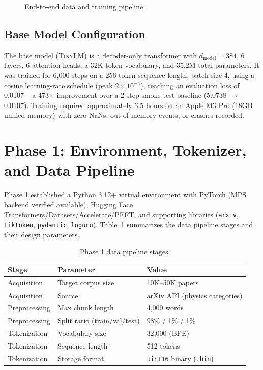 \documentclass[11pt]{article}
\begin{document}
\begin{figure}[h]
\centering
{}
\caption{End-to-end data and training pipeline.}
\label{fig:arch}
\end{figure}

\subsection{Base Model Configuration}
The base model (\textsc{TinyLM}) is a decoder-only transformer with
$d_{\text{model}}=384$, 6 layers, 6 attention heads, a 32K-token vocabulary,
and 35.2M total parameters. It was trained for 6{,}000 steps on a 256-token
sequence length, batch size 4, using a cosine learning-rate schedule
(peak $2\times10^{-4}$), reaching an evaluation loss of 0.0107 -- a
473$\times$ improvement over a 2-step smoke-test baseline (5.0738
$\rightarrow$ 0.0107). Training required approximately 3.5 hours on an
Apple M3 Pro (18GB unified memory) with zero NaNs, out-of-memory events, or
crashes recorded.

\section{Phase 1: Environment, Tokenizer, and Data Pipeline}
Phase 1 established a Python 3.12+ virtual environment with PyTorch (MPS
backend verified available), Hugging Face Transformers/Datasets/Accelerate/PEFT,
and supporting libraries (\texttt{arxiv}, \texttt{tiktoken}, \texttt{pydantic},
\texttt{loguru}). Table~\ref{tab:phase1} summarizes the data pipeline stages
and their design parameters.

\begin{table}[h]
\centering
\caption{Phase 1 data pipeline stages.}
\label{tab:phase1}
\begin{tabular}{@{}lll@{}}
\toprule
Stage & Parameter & Value \\
\midrule
Acquisition & Target corpus size & 10K--50K papers \\
Acquisition & Source & arXiv API (physics categories) \\
Preprocessing & Max chunk length & 4{,}000 words \\
Preprocessing & Split ratio (train/val/test) & 98\% / 1\% / 1\% \\
Tokenization & Vocabulary size & 32{,}000 (BPE) \\
Tokenization & Sequence length & 512 tokens \\
Tokenization & Storage format & \texttt{uint16} binary (\texttt{.bin}) \\
\bottomrule
\end{tabular}
\end{table}
\end{document}
